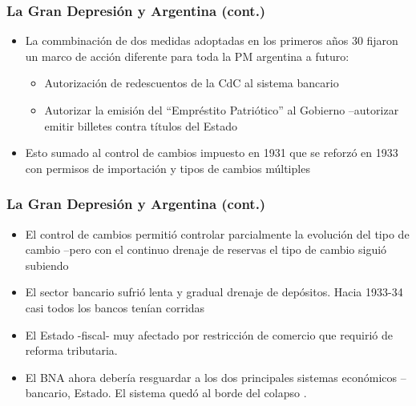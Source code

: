 \documentclass[14pt,aspectratio=169]{beamer}
\begin{document}
\begin{frame}\frametitle{La Gran Depresión y Argentina (cont.)}
          \begin{itemize} \itemsep 15pt
          \item La commbinación de dos medidas adoptadas en los
            primeros años 30 fijaron un marco de acción diferente para
            toda la PM argentina a futuro:
            \begin{itemize}\itemsep10pt \medskip
            \item Autorización de redescuentos de la CdC al sistema
              bancario
              \item Autorizar la emisión del ``Empréstito Patriótico''
                al Gobierno --autorizar emitir billetes contra títulos
                del Estado
              \end{itemize}
              \item Esto sumado al control de cambios impuesto en 1931
                que se reforzó en 1933 con permisos de importación y
                tipos de cambios múltiples
                                       \end{itemize}
      \end{frame}
  


      \begin{frame}\frametitle{La Gran Depresión y Argentina (cont.)}
          \begin{itemize} \itemsep 15pt
          \item El control de cambios permitió controlar parcialmente
            la evolución del tipo de cambio --pero con el continuo
            drenaje de reservas el tipo de cambio siguió subiendo
            \item El sector bancario sufrió lenta y
              gradual drenaje de depósitos. Hacia 1933-34 casi todos
              los bancos tenían corridas
              \item El Estado -fiscal- muy afectado por restricción de
              comercio que requirió de reforma tributaria.
              \item El BNA ahora debería resguardar a los dos
                principales sistemas económicos --bancario, Estado. El
                sistema quedó al borde del colapso .
                                       \end{itemize}
      \end{frame}
  
      
      

      
      
      
\end{document}
